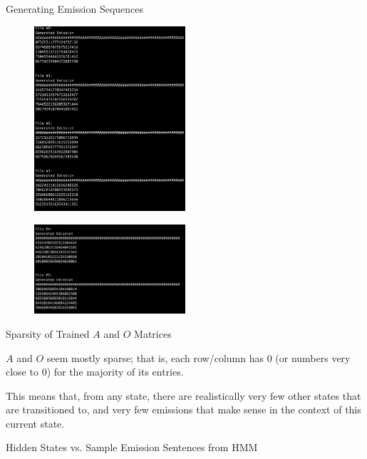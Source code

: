 \problem[5] Generating Emission Sequences
\begin{subsolution}
\begin{figure}[H]
	\centering
	\includegraphics[width=0.5\textwidth]{img/set6template-4b947a80.png}
	\caption{}
	\label{}
\end{figure}
\begin{figure}[H]
	\centering
	\includegraphics[width=0.5\textwidth]{img/set6template-c5d634e4.png}
	\caption{}
	\label{}
\end{figure}
\end{subsolution}
\clearpage

\indent\problem[3] %
Sparsity of Trained $A$ and $O$ Matrices
\begin{subsolution}
$A$ and $O$ seem mostly sparse; that is, each row/column has $0$ (or numbers very close to $0$) for the
majority of its entries.

This means that, from any state, there are realistically very few other states that are transitioned to, and very few emissions
that make sense in the context of this current state.
\end{subsolution}
\clearpage

\indent\problem[5] %
Hidden States vs. Sample Emission Sentences from HMM

